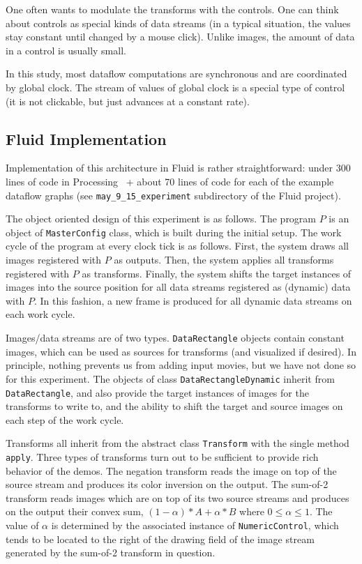 \documentclass{llncs}
\begin{document}
One often wants to modulate the transforms with the controls. One can think about controls
as special kinds of data streams (in a typical situation, the values stay constant until changed by a mouse
click). Unlike images, the amount of data in a control is usually small.

In this study, most dataflow computations are synchronous and are coordinated by global clock.
The stream of values of global clock is a special type of control (it is not clickable, but just
advances at a constant rate).

\subsection{Fluid Implementation}\label{first_fluid}

Implementation of this architecture in Fluid is rather straightforward: under 300 lines of code in
Processing~\cite{Processing} + about 70 lines of code for each of
the example dataflow graphs (see {\tt may\_9\_15\_experiment} subdirectory of the Fluid project).

The object oriented design of this experiment is as follows. The program $P$ is an object of {\tt MasterConfig} class,
which is built during the initial setup.
The work cycle of the program at every clock tick is as follows. First, the system draws
all images registered with $P$ as outputs. Then, the system applies all
transforms registered with $P$ as transforms. Finally, the system shifts the target instances of images
into the source  position for all data streams registered as (dynamic) data with $P$. In this fashion,
a new frame is produced for all dynamic data streams on each work cycle.

Images/data streams are of two types. {\tt DataRectangle} objects contain constant images, which can
be used as sources for transforms (and visualized if desired). In principle, nothing prevents us
from adding input movies, but we have not done so for this experiment. The objects of class {\tt  DataRectangleDynamic}
inherit from {\tt DataRectangle}, and also provide the target instances of images for the transforms to write to, and
the ability to shift the target and source images on each step of the work cycle.

Transforms all inherit from the abstract class {\tt Transform} with the single method {\tt apply}.
Three types of transforms turn out to be sufficient to provide rich behavior of the demos.
The negation transform reads the image on top of the source stream and produces its color inversion on the output.
The sum-of-2 transform reads images which are on top of its two source streams and
produces on the output their convex sum, $(1-\alpha)*A+\alpha*B$ where $0 \leq \alpha \leq 1$. The value of $\alpha$ is determined
by the associated instance of {\tt NumericControl}, which tends to be located to the right
of the drawing field of the image stream generated by the sum-of-2 transform in question.
\end{document}

